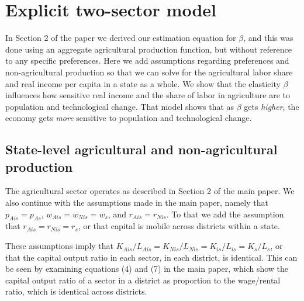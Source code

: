 \documentclass[11pt]{article}
\begin{document}
\section{Explicit two-sector model}\label{APP_solve}
In Section 2 of the paper we derived our estimation equation for $\beta$, and this was done using an aggregate agricultural production function, but without reference to any specific preferences. Here we add assumptions regarding preferences and non-agricultural production so that we can solve for the agricultural labor share and real income per capita in a state as a whole. We show that the elasticity $\beta$ influences how sensitive real income and the share of labor in agriculture are to population and technological change. That model shows that as $\beta$ gets \textit{higher}, the economy gets \textit{more} sensitive to population and technological change.

\subsection{State-level agricultural and non-agricultural production}
The agricultural sector operates as described in Section 2 of the main paper. We also continue with the assumptions made in the main paper, namely that $p_{Ais} = p_{As}$, $w_{Ais} = w_{Nis} = w_{s}$, and $r_{Ais} = r_{Nis}$. To that we add the assumption that $r_{Ais} = r_{Nis} = r_{s}$, or that capital is mobile across districts within a state. 

These assumptions imply that $K_{Ais}/L_{Ais} = K_{Nis}/L_{Nis} = K_{is}/L_{is} = K_s/L_s$, or that the capital output ratio in each sector, in each district, is identical. This can be seen by examining equations (4) and (7) in the main paper, which show the capital output ratio of a sector in a district as proportion to the wage/rental ratio, which is identical across districts.
\end{document}
